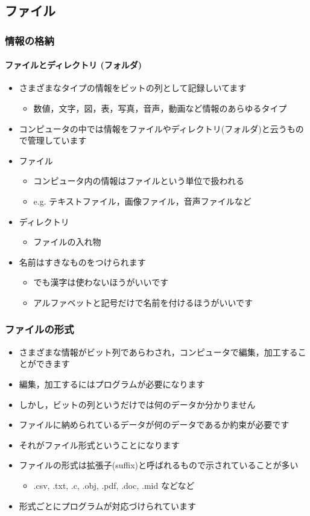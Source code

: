 \subsection{ファイル}
\begin{frame}[shrink]
\frametitle{情報の格納}
\framesubtitle{ファイルとディレクトリ (フォルダ)}
  \begin{itemize}
\item さまざまなタイプの情報をビットの列として記録しいてます
    \begin{itemize}
\item 数値，文字，図，表，写真，音声，動画など情報のあらゆるタイプ
    \end{itemize}
\item コンピュータの中では情報をファイルやディレクトリ(フォルダ)と云うもので管理しています
\item ファイル
    \begin{itemize}
\item コンピュータ内の情報はファイルという単位で扱われる
\item e.g. テキストファイル，画像ファイル，音声ファイルなど
    \end{itemize}
\item ディレクトリ
    \begin{itemize}
\item ファイルの入れ物
    \end{itemize}
\item 名前はすきなものをつけられます
    \begin{itemize}
\item でも漢字は使わないほうがいいです
\item アルファベットと記号だけで名前を付けるほうがいいです
    \end{itemize}
  \end{itemize}
\end{frame}
\begin{frame}
\frametitle{ファイルの形式}
  \begin{itemize}
\item さまざまな情報がビット列であらわされ，コンピュータで編集，加工することができます
\item 編集，加工するにはプログラムが必要になります
\item しかし，ビットの列というだけでは何のデータか分かりません
\item ファイルに納められているデータが何のデータであるか約束が必要です
\item それがファイル形式ということになります
\item ファイルの形式は拡張子(suffix)と呼ばれるもので示されていることが多い
    \begin{itemize}
\item .csv, .txt, .c, .obj, .pdf, .doc, .mid などなど
    \end{itemize}
\item 形式ごとにプログラムが対応づけられています
  \end{itemize}
\end{frame}

